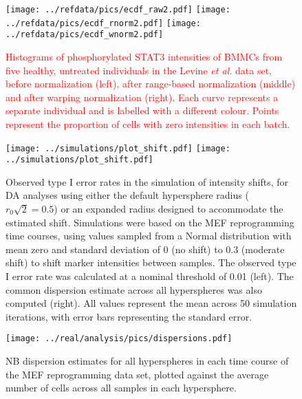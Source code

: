 \documentclass{article}
\newcommand\revised[1]{\textcolor{red}{#1}}
\begin{document}
\begin{figure}[tbp]
    \begin{center}
        \texttt{[image: ../refdata/pics/ecdf\_raw2.pdf]}
        \texttt{[image: ../refdata/pics/ecdf\_rnorm2.pdf]}
        \texttt{[image: ../refdata/pics/ecdf\_wnorm2.pdf]}
    \end{center}
    \caption{\revised{Histograms of phosphorylated STAT3 intensities of BMMCs from five healthy, untreated individuals in the Levine \textit{et al.} data set, before normalization (left), after range-based normalization (middle) and after warping normalization (right).
        Each curve represents a separate individual and is labelled with a different colour.
        Points represent the proportion of cells with zero intensities in each batch.
    }
    }
    \label{fig:quantile}
\end{figure}

\begin{figure}[tbp]
    \begin{center}
        \texttt{[image: ../simulations/plot\_shift.pdf]}
        \texttt{[image: ../simulations/plot\_shift.pdf]}
    \end{center}
    \caption{Observed type I error rates in the simulation of intensity shifts, for DA analyses using either the default hypersphere radius ($r_0\sqrt{2}=0.5$) or an expanded radius designed to accommodate the estimated shift.
        Simulations were based on the MEF reprogramming time courses, using values sampled from a Normal distribution with mean zero and standard deviation of 0 (no shift) to 0.3 (moderate shift) to shift marker intensities between samples. 
        The observed type I error rate was calculated at a nominal threshold of 0.01 (left).
        The common dispersion estimate across all hyperspheres was also computed (right).
        All values represent the mean across 50 simulation iterations, with error bars representing the standard error.
    }
\label{fig:shift_sim}
\end{figure}

\begin{figure}[tbp]
    \begin{center}
    \texttt{[image: ../real/analysis/pics/dispersions.pdf]}
    \end{center}
    \caption{NB dispersion estimates for all hyperspheres in each time course of the MEF reprogramming data set, plotted against the average number of cells across all samples in each hypersphere.}
    \label{fig:nbdisp}
\end{figure}
\end{document}
